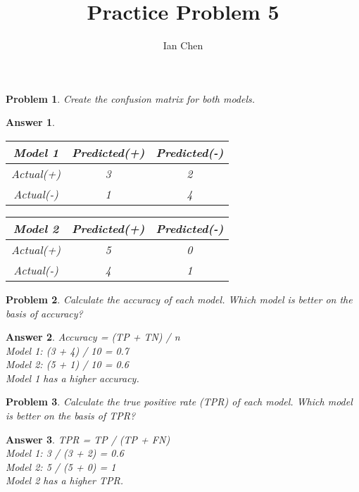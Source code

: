 \documentclass[11pt]{article}
\author{Ian Chen}
\title{Practice Problem 5}
\theoremstyle{description}
\newtheorem{problem}{Problem}
\theoremstyle{break}
\newtheorem*{answer}{Answer}
\begin{document}
    \maketitle

    \begin{problem}
        Create the confusion matrix for both models.
    \end{problem}
    \begin{answer}
        \begin{tabular}{c|c|c}
            Model 1   & Predicted(+) & Predicted(-) \\
            \hline
            Actual(+) & 3            & 2            \\
            \hline
            Actual(-) & 1            & 4            \\
        \end{tabular}
        \begin{tabular}{c|c|c}
            Model 2   & Predicted(+) & Predicted(-) \\
            \hline
            Actual(+) & 5            & 0            \\
            \hline
            Actual(-) & 4            & 1            \\
        \end{tabular}
    \end{answer}

    \begin{problem}
        Calculate the accuracy of each model.
        Which model is better on the basis of accuracy?
    \end{problem}
    \begin{answer}
        Accuracy = (TP + TN) / n\\
        Model 1: (3 + 4) / 10 = 0.7\\
        Model 2: (5 + 1) / 10 = 0.6\\
        Model 1 has a higher accuracy.
    \end{answer}

    \begin{problem}
        Calculate the true positive rate (TPR) of each model.
        Which model is better on the basis of TPR?
    \end{problem}
    \begin{answer}
        TPR = TP / (TP + FN)\\
        Model 1: 3 / (3 + 2) = 0.6\\
        Model 2: 5 / (5 + 0) = 1\\
        Model 2 has a higher TPR.
    \end{answer}
\end{document}
